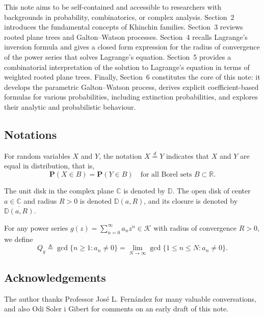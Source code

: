 \documentclass[11pt,a4paper,leqno]{amsart}
\theoremstyle{plain}
\theoremstyle{definition}
\numberwithin{equation}{section}
\def\P{\mathbf{P}}
\begin{document}
This note aims to be self-contained and accessible to researchers with backgrounds in probability, combinatorics, or complex analysis. Section~2 introduces the fundamental concepts of Khinchin families. Section~3 reviews rooted plane trees and Galton–Watson processes. Section~4 recalls Lagrange’s inversion formula and gives a closed form expression for the radius of convergence of the power series that solves Lagrange's equation. Section~5 provides a combinatorial interpretation of the solution to Lagrange’s equation in terms of weighted rooted plane trees. Finally, Section~6 constitutes the core of this note: it develops the parametric Galton–Watson process, derives explicit coefficient-based formulas for various probabilities, including extinction probabilities, and explores their analytic and probabilistic behaviour.
	


	\subsection{Notations}
	
	For random variables \( X \) and \( Y \), the notation \( X \overset{d}{=} Y \) indicates that \( X \) and \( Y \) are equal in distribution, that is,
	\[
	\P(X \in B) =\P(Y \in B) \quad \text{for all Borel sets } B \subset \mathbb{R}.
	\]
	
	The unit disk in the complex plane \( \mathbb{C} \) is denoted by \( \mathbb{D} \). The open disk of center \( a \in \mathbb{C} \) and radius \( R > 0 \) is denoted \( \mathbb{D}(a, R) \), and its closure is denoted by \( \overline{\mathbb{D}(a, R)} \).
	\smallskip
	
	
	For any power series \( g(z) = \sum_{n=0}^\infty a_n z^n \in \mathcal{K} \) with radius of convergence \( R > 0 \), we define
	\[
	Q_g \triangleq \gcd\{n \geq 1 : a_n \neq 0\} = \lim_{N \to \infty} \gcd\{1 \leq n \leq N : a_n \neq 0\}.
	\]
	
	\subsection*{Acknowledgements}
The author thanks Professor José L. Fernández for many valuable conversations, and also Odi Soler i Gibert for comments on an early draft of this note.
	
\end{document}
